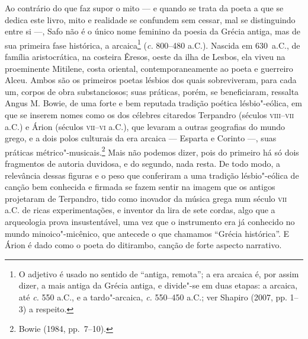 \noindent{}Ao contrário do que faz supor o mito --- e quando se trata da poeta a que se
dedica este livro, mito e realidade se confundem sem cessar, mal se
distinguindo entre si ---, Safo não é o único nome feminino da poesia da Grécia
	antiga, mas de sua primeira fase histórica, a arcaica\footnote{ O adjetivo é
	usado no sentido de “antiga, remota”; a era arcaica é, por assim dizer, a mais
	antiga da Grécia antiga, e divide"-se em duas etapas: a arcaica, até \textit{c.}
	550 a.C., e a tardo"-arcaica, \textit{c.} 550--450 a.C.; ver Shapiro (2007, pp.
	1--3) a respeito.} (\textit{c.} 800--480 a.C.). Nascida em 630~a.C., de família
aristocrática, na costeira Êresos, oeste da ilha de Lesbos, ela viveu na
proeminente Mitilene, costa oriental, contemporaneamente ao poeta e guerreiro
Alceu. Ambos são os primeiros poetas lésbios dos quais sobreviveram, para cada
um, corpos de obra substanciosos; suas práticas, porém, se beneficiaram,
ressalta Angus M. Bowie, de uma forte e bem reputada tradição
poética lésbio"-eólica, em que se inserem nomes como os dos célebres citaredos
Terpandro (séculos \textsc{viii}--\textsc{vii} a.C.) e Árion (séculos
\textsc{vii}--\textsc{vi} a.C.), que levaram a
outras geografias do mundo grego, e a dois polos culturais da era arcaica ---
	Esparta e Corinto ---, suas práticas métrico"-musicais.\footnote{ Bowie (1984,
	pp.~7--10).} Mais não podemos dizer,
pois do primeiro há só dois fragmentos de autoria duvidosa, e do segundo, nada
resta. De todo modo, a relevância dessas figuras e o peso que conferiram a uma
tradição lésbio"-eólica de canção bem conhecida e firmada se
fazem sentir na imagem que os antigos projetaram de Terpandro, tido como
inovador da música grega num século \textsc{vii} a.C. de ricas experimentações, e
inventor da lira de sete cordas, algo que a arqueologia prova insustentável,
uma vez que o instrumento era já conhecido no mundo minoico"-micênico, que
antecede o que chamamos “Grécia histórica”. E Árion é dado como o
poeta do ditirambo, canção de forte aspecto narrativo.



